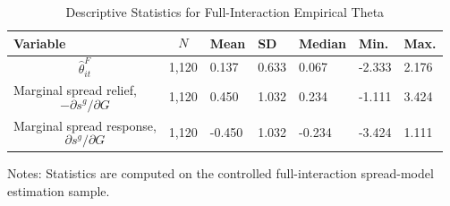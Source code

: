 \begin{table}[H]\centering
\begin{threeparttable}
\caption{Descriptive Statistics for Full-Interaction Empirical Theta}
\label{tab:theta_descriptive_stats}
\scriptsize
\begin{tabularx}{\textwidth}{lYYYYYY}
\toprule
Variable & $$N$$ & Mean & SD & Median & Min. & Max. \\
\midrule
$$\widehat{\theta}^{F}_{it}$$ & 1,120 & 0.137 & 0.633 & 0.067 & -2.333 & 2.176 \\
Marginal spread relief, $$-\partial s^g/\partial G$$ & 1,120 & 0.450 & 1.032 & 0.234 & -1.111 & 3.424 \\
Marginal spread response, $$\partial s^g/\partial G$$ & 1,120 & -0.450 & 1.032 & -0.234 & -3.424 & 1.111 \\
\bottomrule
\end{tabularx}
\begin{tablenotes}[flushleft]\footnotesize
\item Notes: Statistics are computed on the controlled full-interaction spread-model estimation sample.
\end{tablenotes}
\end{threeparttable}
\end{table}
